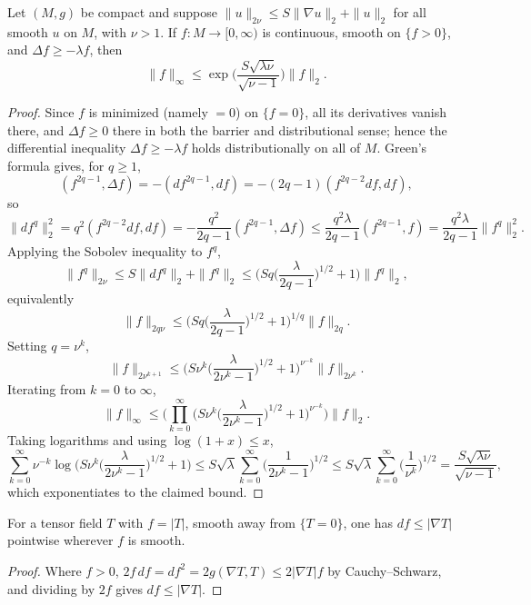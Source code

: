 \begin{theorem}
  \label{thm:pet-ch9-moser-iteration}
  Let $(M,g)$ be compact and suppose $\|u\|_{2\nu}\le S\|\nabla u\|_2+\|u\|_2$
  for all smooth $u$ on $M$, with $\nu>1$. If $f:M\to[0,\infty)$ is continuous,
  smooth on $\{f>0\}$, and $\Delta f\ge-\lambda f$, then
  \[
    \|f\|_\infty\le\exp\Big(\frac{S\sqrt{\lambda\nu}}{\sqrt{\nu-1}}\Big)\|f\|_2.
  \]
\end{theorem}
\begin{proof}
  Since $f$ is minimized (namely $=0$) on $\{f=0\}$, all its derivatives vanish
  there, and $\Delta f\ge0$ there in both the barrier and distributional
  sense; hence the differential inequality $\Delta f\ge-\lambda f$ holds
  distributionally on all of $M$. Green's formula gives, for $q\ge1$,
  \[
    (f^{2q-1},\Delta f)=-(df^{2q-1},df)=-(2q-1)(f^{2q-2}df,df),
  \]
  so
  \[
    \|df^q\|_2^2=q^2(f^{2q-2}df,df)=-\frac{q^2}{2q-1}(f^{2q-1},\Delta f)
    \le\frac{q^2\lambda}{2q-1}(f^{2q-1},f)=\frac{q^2\lambda}{2q-1}\|f^q\|_2^2.
  \]
  Applying the Sobolev inequality to $f^q$,
  \[
    \|f^q\|_{2\nu}\le S\|df^q\|_2+\|f^q\|_2
    \le\Big(Sq\Big(\frac\lambda{2q-1}\Big)^{1/2}+1\Big)\|f^q\|_2,
  \]
  equivalently
  \[
    \|f\|_{2q\nu}\le\Big(Sq\Big(\frac\lambda{2q-1}\Big)^{1/2}+1\Big)^{1/q}\|f\|_{2q}.
  \]
  Setting $q=\nu^k$,
  \[
    \|f\|_{2\nu^{k+1}}\le\Big(S\nu^k\Big(\frac\lambda{2\nu^k-1}\Big)^{1/2}+1\Big)^{\nu^{-k}}\|f\|_{2\nu^k}.
  \]
  Iterating from $k=0$ to $\infty$,
  \[
    \|f\|_\infty\le\Big(\prod_{k=0}^\infty\Big(S\nu^k\Big(\frac\lambda{2\nu^k-1}\Big)^{1/2}+1\Big)^{\nu^{-k}}\Big)\|f\|_2.
  \]
  Taking logarithms and using $\log(1+x)\le x$,
  \[
    \sum_{k=0}^\infty\nu^{-k}\log\Big(S\nu^k\Big(\frac\lambda{2\nu^k-1}\Big)^{1/2}+1\Big)
    \le S\sqrt\lambda\sum_{k=0}^\infty\Big(\frac1{2\nu^k-1}\Big)^{1/2}
    \le S\sqrt\lambda\sum_{k=0}^\infty\Big(\frac1{\nu^k}\Big)^{1/2}
    =\frac{S\sqrt{\lambda\nu}}{\sqrt{\nu-1}},
  \]
  which exponentiates to the claimed bound.
\end{proof}

\begin{lemma}
  \label{lem:pet-ch9-kato-inequality}
  For a tensor field $T$ with $f=|T|$, smooth away from $\{T=0\}$, one has
  $df\le|\nabla T|$ pointwise wherever $f$ is smooth.
\end{lemma}
\begin{proof}
  Where $f>0$, $2f\,df=df^2=2g(\nabla T,T)\le2|\nabla T|f$ by Cauchy--Schwarz,
  and dividing by $2f$ gives $df\le|\nabla T|$.
\end{proof}

